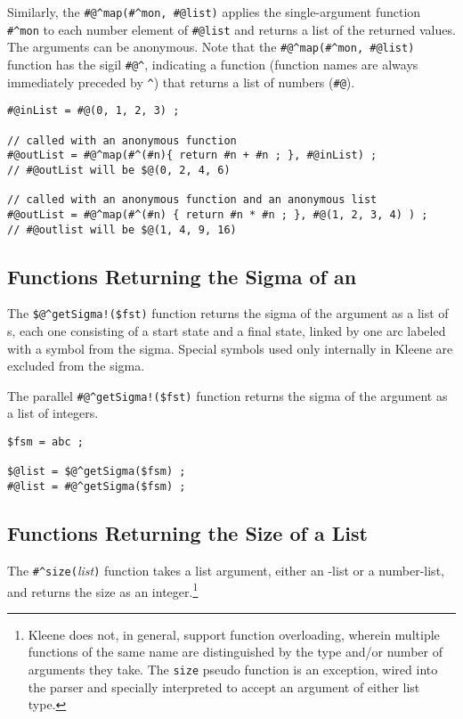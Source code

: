 Similarly, the 
\verb!#@^map(#^mon, #@list)!  applies the single-argument 
function \verb!#^mon! to each number
element of \verb!#@list! and returns a list of the returned values.  The
arguments can be anonymous.  Note that the \verb!#@^map(#^mon, #@list)! function has the sigil
\verb!#@^!, indicating a function (function names are always immediately preceded by
\verb!^!) that returns a list of numbers (\verb!#@!).

\begin{Verbatim}
#@inList = #@(0, 1, 2, 3) ;

// called with an anonymous function
#@outList = #@^map(#^(#n){ return #n + #n ; }, #@inList) ;
// #@outList will be $@(0, 2, 4, 6)

// called with an anonymous function and an anonymous list
#@outList = #@^map(#^(#n) { return #n * #n ; }, #@(1, 2, 3, 4) ) ;
// #@outlist will be $@(1, 4, 9, 16)
\end{Verbatim}

\subsection{Functions Returning the Sigma of an \fsm{}}

The \verb+$@^getSigma!($fst)+ function returns the sigma of the argument
\fsm{} as a list of \fsm{}s, each one consisting of a start state and a final
state, linked by one arc labeled with a symbol from the sigma.  Special symbols
used only internally in Kleene are excluded from the sigma.

The parallel \verb+#@^getSigma!($fst)+ function returns the sigma of the argument
\fsm{} as a list of integers.

\begin{Verbatim}
$fsm = abc ;

$@list = $@^getSigma($fsm) ;
#@list = #@^getSigma($fsm) ;
\end{Verbatim}

\subsection{Functions Returning the Size of a List}

The \verb+#^size(+\textit{list}\verb!)! function takes a list argument,
either an \fsm{}-list or a number-list, and returns the
size as an integer.\footnote{Kleene does not, in general, support function
overloading, wherein multiple functions of the same name are distinguished
by the type and/or number of arguments they take.
The \texttt{size} pseudo function is an exception,
wired into the parser and specially interpreted to accept an argument of either list
type.}

